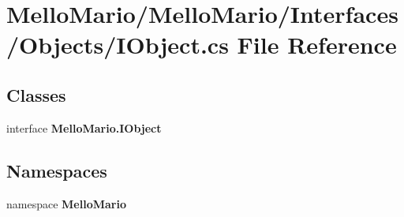 \section{Mello\+Mario/\+Mello\+Mario/\+Interfaces/\+Objects/\+I\+Object.cs File Reference}
\label{IObject_8cs}
\subsection*{Classes}
\begin{DoxyCompactItemize}
\item 
interface \textbf{ Mello\+Mario.\+I\+Object}
\end{DoxyCompactItemize}
\subsection*{Namespaces}
\begin{DoxyCompactItemize}
\item 
namespace \textbf{ Mello\+Mario}
\end{DoxyCompactItemize}
